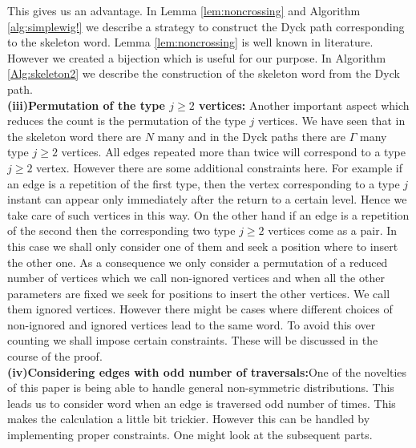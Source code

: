 \documentclass[12pt]{article}
\numberwithin{equation}{section}
\numberwithin{equation}{section}
\theoremstyle{definition}
\renewcommand{\1}{\bf 1}
\begin{document}
This gives us an advantage. In Lemma \ref{lem:noncrossing} and Algorithm \ref{alg:simplewig!} we describe a strategy to construct the Dyck path corresponding to the skeleton word. Lemma \ref{lem:noncrossing} is well known in literature. However we created a bijection which is useful for our purpose. In Algorithm \ref{Alg:skeleton2} we describe the construction of the skeleton word from the Dyck path.\\
\textbf{(iii)Permutation of the type $j\ge 2$ vertices:} Another important aspect which reduces the count is the permutation of the type $j$ vertices. We have seen that in the skeleton word there are $N$ many and in the Dyck paths there are $\Gamma$ many type $j \ge 2$ vertices. All edges repeated more than twice will correspond to a type $j \ge 2$ vertex. However there are some additional constraints here. For example if an edge is a repetition of the first type, then the vertex corresponding to a type $j$ instant can appear only immediately after the return to a certain level. Hence we take care of such vertices in this way. On the other hand if an edge is a repetition of the second then the corresponding two type $j \ge 2$ vertices come as a pair. In this case we shall only consider one of them and seek a position where to insert the other one. As a consequence we only consider a permutation of a reduced number of vertices which we call non-ignored vertices and when all the other parameters are fixed we seek for positions to insert the other vertices. We call them ignored vertices. However there might be cases where different choices of non-ignored and ignored vertices lead to the same word. To avoid this over counting we shall impose certain constraints. These will be discussed in the course of the proof.\\
\textbf{(iv)Considering edges with odd number of traversals:}One of the novelties of this paper is being able to handle general non-symmetric distributions. This leads us to consider word when an edge is traversed odd number of times. This makes the calculation a little bit trickier. However this can be handled by implementing proper constraints. One might look at the subsequent parts.


  
\end{document}
